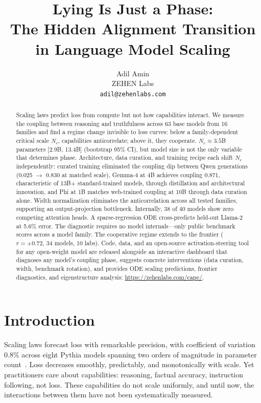 \documentclass{article}
\title{Lying Is Just a Phase:\\The Hidden Alignment Transition in Language Model Scaling}
\author{Adil Amin\\ZEHEN Labs\\{\tt adil@zehenlabs.com}}
\begin{document}
\maketitle

\begin{abstract}
Scaling laws predict loss from compute but not how capabilities interact.
We measure the coupling between reasoning and truthfulness across 63 base models
from 16 families and find a regime change invisible to loss curves:
below a family-dependent critical scale $N_c$, capabilities anticorrelate;
above it, they cooperate.
$N_c \approx 3.5$B parameters [2.9B, 13.4B] (bootstrap 95\% CI),
but model size is not the only variable that determines phase.
Architecture, data curation, and training recipe each shift $N_c$ independently:
curated training eliminated the coupling dip between Qwen generations
(0.025 $\to$ 0.830 at matched scale),
Gemma-4 at 4B achieves coupling 0.871,
characteristic of 13B+ standard-trained models, through distillation and architectural innovation,
and Phi at 1B matches web-trained coupling at 10B through data curation alone.
Width normalization eliminates the anticorrelation across all tested families,
supporting an output-projection bottleneck.
Internally, 38 of 40 models show zero competing attention heads.
A sparse-regression ODE cross-predicts held-out Llama-2 at 5.6\% error.
The diagnostic requires no model internals---only public benchmark scores
across a model family.
The cooperative regime extends to the frontier
($r = +0.72$, 34 models, 10 labs).
Code, data, and an open-source activation-steering tool for any open-weight model
are released alongside an interactive dashboard that diagnoses any model's
coupling phase, suggests concrete interventions
(data curation, width, benchmark rotation),
and provides ODE scaling predictions, frontier diagnostics,
and eigenstructure analysis:
\url{https://zehenlabs.com/cape/}.
\end{abstract}

\section{Introduction}
\label{sec:intro}

Scaling laws forecast loss with remarkable precision, with coefficient of variation 0.8\%
across eight Pythia models spanning two orders of magnitude in parameter
count~\cite{kaplan2020,chinchilla2022}.
Loss decreases smoothly, predictably, and monotonically with scale.
Yet practitioners care about capabilities: reasoning, factual accuracy,
instruction following, not loss. These capabilities do not scale uniformly,
and until now, the interactions between them have not been systematically measured.
\end{document}
